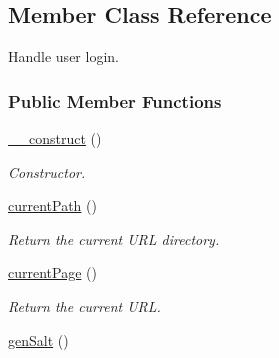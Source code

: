 \hypertarget{classMember}{\subsection{Member Class Reference}
\label{classMember}
}


Handle user login.  


\subsubsection*{Public Member Functions}
\begin{DoxyCompactItemize}
\item 
\hyperlink{classMember_a1b63bcda0a4ff98a704d8219dd00940e}{\-\_\-\-\_\-construct} ()
\begin{DoxyCompactList}\small\item\em Constructor. \end{DoxyCompactList}\item 
\hypertarget{classMember_af167bc35d83e6fd60e875ad800028924}{\hyperlink{classMember_af167bc35d83e6fd60e875ad800028924}{current\-Path} ()}\label{classMember_af167bc35d83e6fd60e875ad800028924}

\begin{DoxyCompactList}\small\item\em Return the current U\-R\-L directory. \end{DoxyCompactList}\item 
\hypertarget{classMember_af4bf2a5c4bb9839768c7547707fb3ef0}{\hyperlink{classMember_af4bf2a5c4bb9839768c7547707fb3ef0}{current\-Page} ()}\label{classMember_af4bf2a5c4bb9839768c7547707fb3ef0}

\begin{DoxyCompactList}\small\item\em Return the current U\-R\-L. \end{DoxyCompactList}\item 
\hypertarget{classMember_a4f141835943affa73028f0f412522670}{\hyperlink{classMember_a4f141835943affa73028f0f412522670}{gen\-Salt} ()}\label{classMember_a4f141835943affa73028f0f412522670}


\end{DoxyCompactItemize}
